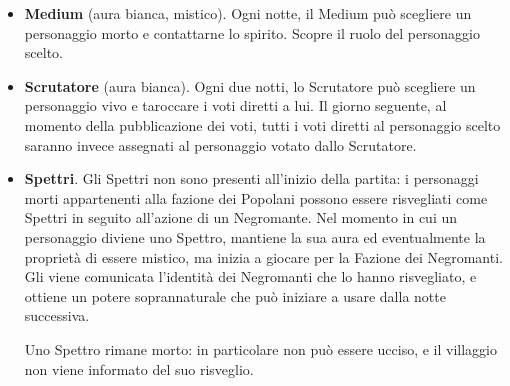 \documentclass[a4paper,10pt]{article}
\begin{document}
\begin{itemize}
 
 


 \item {\bf Medium} (aura bianca, mistico). Ogni notte, il Medium può scegliere un personaggio morto e contattarne lo spirito. Scopre il ruolo del personaggio scelto.

 
 \item {\bf Scrutatore} (aura bianca). Ogni due notti, lo Scrutatore può scegliere  un personaggio vivo e taroccare i voti diretti a lui. Il giorno seguente, al momento della pubblicazione dei voti, tutti i voti diretti al personaggio scelto saranno invece assegnati al personaggio votato dallo Scrutatore.
 

 \item {\bf Spettri}. Gli Spettri non sono presenti all'inizio della partita: i personaggi morti appartenenti alla fazione dei Popolani possono essere risvegliati come Spettri in seguito all'azione di un Negromante.
 Nel momento in cui un personaggio diviene uno Spettro, mantiene la sua aura ed eventualmente la proprietà di essere mistico, ma inizia a giocare per la Fazione dei Negromanti. Gli viene comunicata l'identità dei Negromanti che lo hanno risvegliato, e ottiene un potere soprannaturale che può iniziare a usare dalla notte successiva. %
 
 Uno Spettro rimane morto: in particolare non può essere ucciso, e il villaggio non viene informato del suo risveglio.
 
 
\end{itemize}
\end{document}
